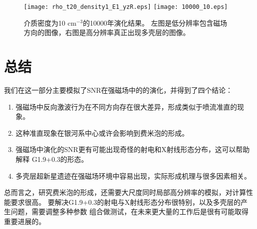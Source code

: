 \begin{figure*}
    \centering
    \texttt{[image: rho\_t20\_density1\_E1\_yzR.eps]}
    \texttt{[image: 10000\_10.eps]}
    \caption{介质密度为10 cm$^{-3}$的10000年演化结果。
    左图是低分辨率包含磁场方向的图像，右图是高分辨率真正出现多壳层的图像。}
\label{fig:shells}
\end{figure*}

\section{总结}
\label{MagSum}

我们在这一部分主要模拟了SNR在强磁场中的的演化，并得到了四个结论：

\begin{enumerate}

    \item 强磁场中反向激波行为在不同方向存在很大差异，形成类似于喷流准直的现象。

    \item 这种准直现象在银河系中心或许会影响到费米泡的形成。

    \item 强磁场中演化的SNR更有可能出现奇怪的射电和X射线形态分布，这可以帮助解释
    G1.9+0.3的形态。

    \item 多壳层超新星遗迹在强磁场环境中容易出现，实际形成机理与很多因素相关。

\end{enumerate}

总而言之，研究费米泡的形成，还需要大尺度同时局部高分辨率的模拟，对计算性能要求很高。
要解决G1.9+0.3的射电与X射线形态分布很特别，以及多壳层的产生问题，需要调整多种参数
组合做测试，在未来更大量的工作后是很有可能取得重要进展的。
